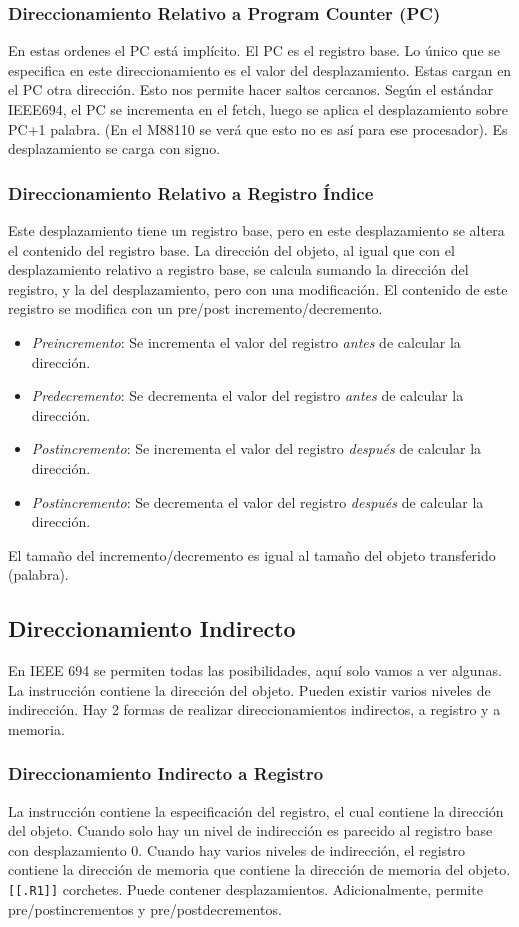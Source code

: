 \documentclass[a4paper,11pt,spanish]{report}
\begin{document}
\subsubsection{Direccionamiento Relativo a Program Counter (PC)}
En estas ordenes el PC está implícito. El PC es el registro base. Lo único que se especifica en este direccionamiento es el valor del desplazamiento. Estas cargan en el PC otra dirección. Esto nos permite hacer saltos cercanos. Según el estándar IEEE694, el PC se incrementa en el fetch, luego se aplica el desplazamiento sobre PC+1 palabra. (En el M88110 se verá que esto no es así para ese procesador). Es desplazamiento se carga con signo.
\subsubsection{Direccionamiento Relativo a Registro Índice}
Este desplazamiento tiene un registro base, pero en este desplazamiento se altera el contenido del registro base. La dirección del objeto, al igual que con el desplazamiento relativo a registro base, se calcula sumando la dirección del registro, y la del desplazamiento, pero con una modificación.
El contenido de este registro se modifica con un pre/post incremento/decremento.
\begin{itemize}
\item \emph{Preincremento}: Se incrementa el valor del registro \emph{antes} de calcular la dirección.
\item \emph{Predecremento}: Se decrementa el valor del registro \emph{antes} de calcular la dirección.
\item \emph{Postincremento}: Se incrementa el valor del registro \emph{después} de calcular la dirección.
\item \emph{Postincremento}: Se decrementa el valor del registro \emph{después} de calcular la dirección.
\end{itemize}
El tamaño del incremento/decremento es igual al tamaño del objeto transferido (palabra).
\subsection{Direccionamiento Indirecto}
En IEEE 694 se permiten todas las posibilidades, aquí solo vamos a ver algunas. La instrucción contiene la dirección del objeto. Pueden existir varios niveles de indirección. Hay 2 formas de realizar direccionamientos indirectos, a registro y a memoria.
\subsubsection{Direccionamiento Indirecto a Registro}
La instrucción contiene la especificación del registro, el cual contiene la dirección del objeto. Cuando solo hay un nivel de indirección es parecido al registro base con desplazamiento 0. Cuando hay varios niveles de indirección, el registro contiene la dirección de memoria que contiene la dirección de memoria del objeto. \verb|[[.R1]]|  corchetes.
Puede contener desplazamientos. Adicionalmente, permite pre/postincrementos y pre/postdecrementos.
\end{document}
